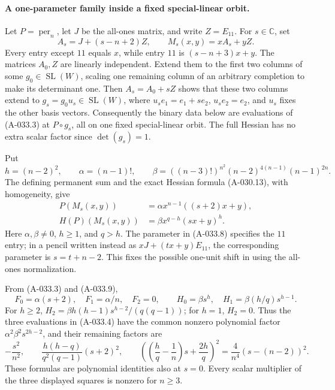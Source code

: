 \paragraph{A one-parameter family inside a fixed special-linear orbit.}
Let \(P=\operatorname{per}_n\), let \(J\) be the all-ones matrix,
and write \(Z=E_{11}\). For \(s\in\mathbb C\), set
\[
 A_s=J+(s-n+2)Z,\qquad
                       M_s(x,y)=xA_s+yZ.                      \tag{A-033.8}
\]
Every entry except \(11\) equals \(x\), while entry \(11\)
is \((s-n+3)x+y\).
The matrices \(A_0,Z\) are linearly independent.
Extend them to the first two columns of some
\(g_0\in\operatorname{SL}(W)\), scaling one remaining column
of an arbitrary completion to make its determinant one.
Then \(A_s=A_0+sZ\) shows that these two columns extend to
\(g_s=g_0u_s\in\operatorname{SL}(W)\), where
\(u_se_1=e_1+s e_2\), \(u_se_2=e_2\), and \(u_s\) fixes
the other basis vectors.
Consequently the binary data below are evaluations of
(A-033.3) at \(P\circ g_s\), all on one fixed
special-linear orbit. The full Hessian has no extra scalar
factor since \(\det(g_s)=1\).

Put
\[
 h=(n-2)^2,\qquad
 \alpha=(n-1)!,\qquad
 \beta=((n-3)!)^{n^2}(n-2)^{4(n-1)}(n-1)^{2n}.
\]
The defining permanent sum and the exact Hessian formula
(A-030.13), with homogeneity, give
\[
 \begin{split}
 P(M_s(x,y))&=\alpha x^{n-1}((s+2)x+y),\\
 H(P)(M_s(x,y))&=\beta x^{q-h}(sx+y)^h.
 \end{split}                                                   \tag{A-033.9}
\]
Here \(\alpha,\beta\ne0\), \(h\geq1\), and \(q>h\).
The parameter in (A-033.8) specifies the \(11\) entry;
in a pencil written instead as \(xJ+(t x+y)E_{11}\), the
corresponding parameter is \(s=t+n-2\).
This fixes the possible one-unit shift in using the
all-ones normalization.

From (A-033.3) and (A-033.9),
\[
 F_0=\alpha(s+2),\quad F_1=\alpha/n,\quad F_2=0,\qquad
 H_0=\beta s^h,\quad H_1=\beta(h/q)s^{h-1}.
\]
For \(h\geq2\),
\(H_2=\beta h(h-1)s^{h-2}/(q(q-1))\);
for \(h=1\), \(H_2=0\).
Thus the three evaluations in (A-033.4) have the common
nonzero polynomial factor \(\alpha^2\beta^2s^{2h-2}\),
and their remaining factors are
\[
 -\frac{s^2}{n^2},\qquad
 \frac{h(h-q)}{q^2(q-1)}(s+2)^2,\qquad
 \left(\left(\frac hq-\frac1n\right)s+\frac{2h}q\right)^2
                 =\frac4{n^4}(s-(n-2))^2.                    \tag{A-033.10}
\]
These formulas are polynomial identities also at \(s=0\).
Every scalar multiplier of the three displayed squares is
nonzero for \(n\geq3\).

